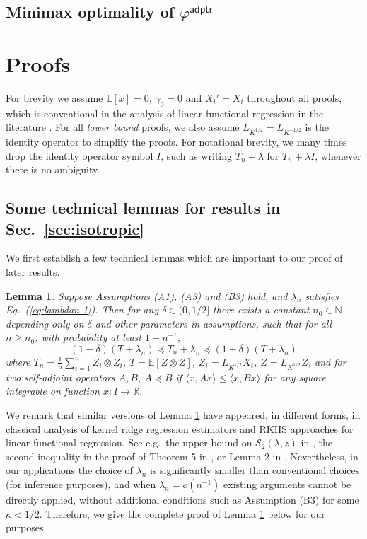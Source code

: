 \documentclass[11pt,a4paper]{article}
\theoremstyle{definition}
\theoremstyle{plain}
\newtheorem{lemma}{Lemma}[section]
\theoremstyle{remark}
\newcommand{\adptr}{\mathsf{adptr}}
\begin{document}
\subsection{Minimax optimality of $\varphi^{\adptr}$}


\section{Proofs}

For brevity we assume $\mathbb E[x]=0$, $\gamma_0=0$ and $X_i'=X_i$ throughout all proofs, which is conventional in the analysis of linear functional regression in the literature \citep{cai2012minimax,yuan2010reproducing}.
For all \emph{lower bound} proofs, we also assume $L_{K^{1/2}}=L_{K^{-1/2}}$ is the identity operator to simplify the proofs.
For notational brevity, we many times drop the identity operator symbol $I$, such as writing $T_n+\lambda$ for $T_n+\lambda I$, whenever there is no ambiguity.



\subsection{Some technical lemmas for results in Sec.~\ref{sec:isotropic}}

We first establish a few technical lemmas which are important to our proof of later results.
\begin{lemma}
Suppose Assumptions (A1), (A3) and (B3) hold, and $\lambda_n$ satisfies Eq.~(\ref{eq:lambdan-1}). Then for any $\delta\in(0,1/2]$ there exists a constant $n_0\in\mathbb N$ depending only on $\delta$ and other parameters in assumptions,
 such that for all $n\geq n_0$, with probability at least $1-n^{-1}$,
$$
(1-\delta)(T+\lambda_n)\preceq T_n+\lambda_n \preceq (1+\delta)(T+\lambda_n)
$$
where $T_n=\frac{1}{n}\sum_{i=1}^n Z_i\otimes Z_i$, $T=\mathbb E[Z\otimes Z]$, $Z_i=L_{K^{1/2}}X_i$, $Z=L_{K^{1/2}}Z$, and for two self-adjoint operators $A,B$, $A\preceq B$ if $\langle x,Ax\rangle\leq \langle x, Bx\rangle$
for any square integrable on function $x:I\to\mathbb R$.
\label{lem:empirical-population-cov}
\end{lemma}

We remark that similar versions of Lemma \ref{lem:empirical-population-cov} have appeared, in different forms, in classical analysis of kernel ridge regression estimators and RKHS approaches for linear functional regression.
See e.g.~the upper bound on $\mathcal S_2(\lambda,z)$ in \citep{caponnetto2007optimal}, the second inequality in the proof of Theorem 5 in \citep{smale2007learning}, or Lemma 2 in \citep{cai2012minimax}.
Nevertheless, in our applications the choice of $\lambda_n$ is significantly smaller than conventional choices (for inference purposes), and when $\lambda_n = o(n^{-1})$ existing arguments cannot be directly applied,
without additional conditions such as Assumption (B3) for some $\kappa<1/2$. Therefore, we give the complete proof of Lemma \ref{lem:empirical-population-cov} below for our purposes.
\end{document}
